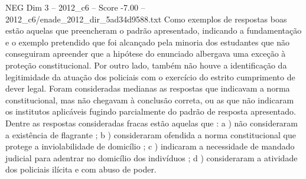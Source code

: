 \begin{textsample}{NEG Dim 3 – 2012\_c6 – Score -7.00 – 2012\_c6/enade\_2012\_dir\_5ad34d9588.txt}
Como exemplos de respostas boas estão aquelas que preencheram o padrão apresentado, indicando a fundamentação e o exemplo pretendido que foi alcançado pela minoria dos estudantes que não conseguiram apreender que a hipótese do enunciado albergava uma exceção à proteção constitucional.
Por outro lado, também não houve a identificação da legitimidade da atuação dos policiais com o exercício do estrito cumprimento de dever legal.
Foram consideradas medianas as respostas que indicavam a norma constitucional, mas não chegavam à conclusão correta, ou as que não indicaram os institutos aplicáveis fugindo parcialmente do padrão de resposta apresentado.
Dentre as respostas consideradas fracas estão aquelas que : a ) não consideraram a existência de flagrante ; b ) consideraram ofendida a norma constitucional que protege a inviolabilidade de domicílio ; c ) indicaram a necessidade de mandado judicial para adentrar no domicílio dos indivíduos ; d ) consideraram a atividade dos policiais ilícita e com abuso de poder.

\end{textsample}
